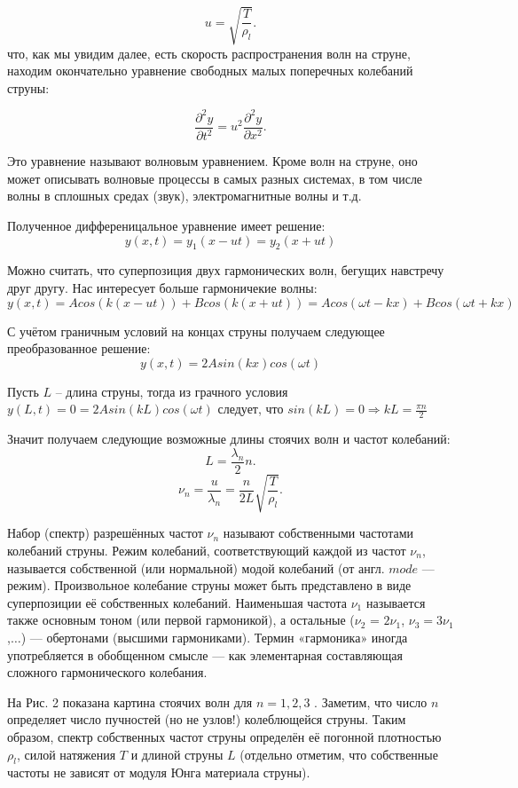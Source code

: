 \documentclass[a4paper,12pt]{article} %
\begin{document}
\[ u = \sqrt{\frac{T}{\rho_l}} .\]
что, как мы увидим далее, есть скорость распространения волн на струне, находим окончательно уравнение свободных малых поперечных колебаний струны:

\[  \frac{\partial^2 y}{\partial t^2} = u^2\frac{\partial^2 y}{\partial x^2} .\]

Это уравнение называют волновым уравнением. Кроме волн на струне, оно
может описывать волновые процессы в самых разных системах, в том числе
волны в сплошных средах (звук), электромагнитные волны и т.д.

Полученное дифференицальное уравнение имеет решение:
\[y(x,t) = y_1(x-ut) = y_2(x+ut)\]

Можно считать, что суперпозиция двух гармонических волн,
бегущих навстречу друг другу. Нас интересует больше гармоничекие волны: 
\[y(x,t) = Acos(k(x-ut)) + Bcos(k(x+ut)) = Acos(\omega t -kx) + Bcos(\omega t +kx)\]

С учётом граничным условий на концах струны получаем следующее преобразованное решение:
\[y(x,t) = 2Asin(kx)cos(\omega t)\]

 Пусть $L$ -- длина струны, тогда из грачного условия $y(L,t) = 0 = 2Asin(kL)cos(\omega t)$ следует, что $sin(kL) = 0 \Rightarrow kL = \frac{\pi n}{2}$

Значит получаем следующие возможные длины стоячих волн и частот колебаний:
\[ L = \frac{\lambda_n}{2}n .\]
\[ \nu_n = \frac{u}{\lambda_n} = \frac{n}{2L} \sqrt{\frac{T}{\rho_l}} .\]

Набор (спектр) разрешённых частот $\nu_n$ называют собственными частотами
колебаний струны. Режим колебаний, соответствующий каждой из частот $\nu_n$,
называется собственной (или нормальной) модой колебаний (от англ. $mode$ —
режим). Произвольное колебание струны может быть представлено в виде суперпозиции её собственных колебаний. Наименьшая частота $\nu_1$ называется
также основным тоном (или первой гармоникой), а остальные ($\nu_2$ = $2 \nu_1$, $\nu_3 = 3\nu_1$,$\dots$) — обертонами (высшими гармониками). Термин «гармоника» иногда
употребляется в обобщенном смысле — как элементарная составляющая
сложного гармонического колебания.

На Рис. 2 показана картина стоячих волн для $n = 1, 2, 3$ . Заметим, что
число $n$ определяет число пучностей (но не узлов!) колеблющейся струны.
Таким образом, спектр собственных частот струны определён её погонной
плотностью $\rho_l$, силой натяжения $T$ и длиной струны $L$ (отдельно отметим, что
собственные частоты не зависят от модуля Юнга материала струны).
\end{document}
